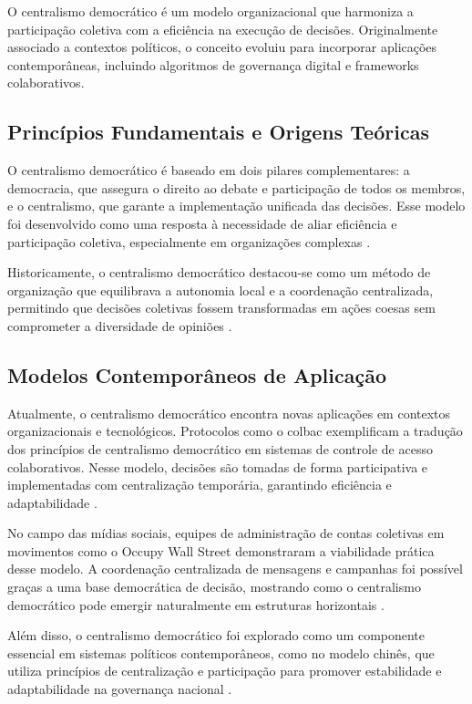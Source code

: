 O centralismo democrático é um modelo organizacional que harmoniza a
participação coletiva com a eficiência na execução de decisões.
Originalmente associado a contextos políticos, o conceito evoluiu para
incorporar aplicações contemporâneas, incluindo algoritmos de governança
digital e frameworks colaborativos.

\subsection{Princípios Fundamentais e Origens Teóricas}
\label{sec:principios_origens_teoricas}

O centralismo democrático é baseado em dois pilares complementares: a
democracia, que assegura o direito ao debate e participação de todos os
membros, e o centralismo, que garante a implementação unificada das
decisões. Esse modelo foi desenvolvido como uma resposta à necessidade de
aliar eficiência e participação coletiva, especialmente em organizações
complexas \cite{EstatutosDoPCP}.

Historicamente, o centralismo democrático destacou-se como um método de
organização que equilibrava a autonomia local e a coordenação centralizada,
permitindo que decisões coletivas fossem transformadas em ações coesas sem
comprometer a diversidade de opiniões \cite{CGTPStatutes}.

\subsection{Modelos Contemporâneos de Aplicação}
\label{sec:modelos_contemporaneos}

Atualmente, o centralismo democrático encontra novas aplicações em
contextos organizacionais e tecnológicos. Protocolos como o \gls{colbac}
exemplificam a tradução dos princípios de centralismo democrático em
sistemas de controle de acesso colaborativos. Nesse modelo, decisões são
tomadas de forma participativa e implementadas com centralização
temporária, garantindo eficiência e adaptabilidade \cite{Colbac}.

No campo das mídias sociais, equipes de administração de contas coletivas
em movimentos como o Occupy Wall Street demonstraram a viabilidade prática
desse modelo. A coordenação centralizada de mensagens e campanhas foi
possível graças a uma base democrática de decisão, mostrando como o
centralismo democrático pode emergir naturalmente em estruturas horizontais
\cite{SocialMediaTeamsAsDigitalVanguards}.

Além disso, o centralismo democrático foi explorado como um componente
essencial em sistemas políticos contemporâneos, como no modelo chinês, que
utiliza princípios de centralização e participação para promover
estabilidade e adaptabilidade na governança nacional
\cite{StillaCenturyoftheChineseModel}.

